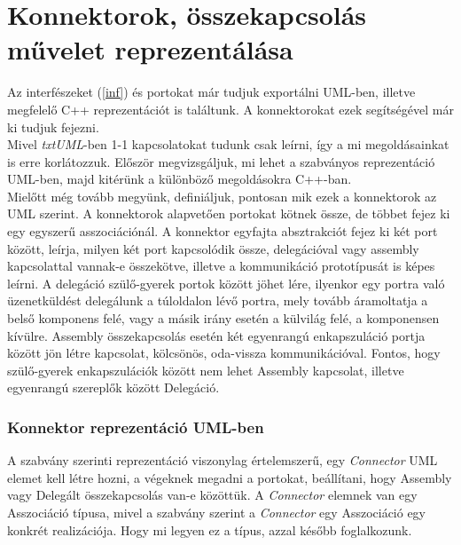 \documentclass[a4paper,12pt]{report}
\begin{document}
\section{Konnektorok, összekapcsolás művelet reprezentálása} \label{connect}
Az interfészeket (\ref{inf}) és portokat már tudjuk exportálni UML-ben, illetve megfelelő C++ reprezentációt is találtunk. A konnektorokat ezek segítségével már ki tudjuk fejezni. \\
Mivel \textit{txtUML}-ben 1-1 kapcsolatokat tudunk csak leírni, így a mi megoldásainkat is erre korlátozzuk. Először megvizsgáljuk, mi lehet a szabványos reprezentáció UML-ben, majd kitérünk a különböző megoldásokra C++-ban. \\
Mielőtt még tovább megyünk, definiáljuk, pontosan mik ezek a konnektorok az UML szerint. A konnektorok alapvetően portokat kötnek össze, de többet fejez ki egy egyszerű asszociációnál. A konnektor egyfajta absztrakciót fejez ki két port között, leírja, milyen két port kapcsolódik össze, delegációval vagy assembly kapcsolattal vannak-e összekötve, illetve a kommunikáció prototípusát is képes leírni. A delegáció szülő-gyerek portok között jöhet lére, ilyenkor egy portra való üzenetküldést delegálunk a túloldalon lévő portra, mely tovább áramoltatja a belső komponens felé, vagy a másik irány esetén a külvilág felé, a komponensen kívülre. Assembly összekapcsolás esetén két egyenrangú enkapszuláció portja között jön létre kapcsolat, kölcsönös, oda-vissza kommunikációval. Fontos, hogy szülő-gyerek enkapszulációk között nem lehet Assembly kapcsolat, illetve egyenrangú szereplők között Delegáció.
\subsubsection{Konnektor reprezentáció UML-ben}
A szabvány szerinti reprezentáció viszonylag értelemszerű, egy \textit{Connector} UML elemet kell létre hozni, a végeknek megadni a portokat, beállítani, hogy Assembly vagy Delegált összekapcsolás van-e közöttük. A \textit{Connector} elemnek van egy Asszociáció típusa, mivel a szabvány szerint a \textit{Connector} egy Asszociáció egy konkrét realizációja. Hogy mi legyen ez a típus, azzal később foglalkozunk.
\end{document}
